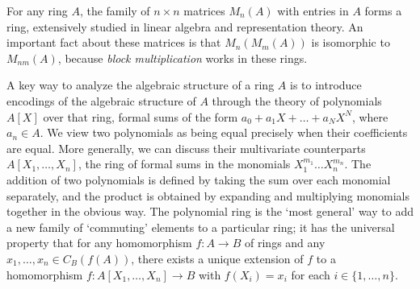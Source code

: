 \begin{example}
    For any ring $A$, the family of $n \times n$ matrices $M_n(A)$ with entries in $A$ forms a ring, extensively studied in linear algebra and representation theory. An important fact about these matrices is that $M_n(M_m(A))$ is isomorphic to $M_{nm}(A)$, because \emph{block multiplication} works in these rings.
\end{example}

\begin{example}
    A key way to analyze the algebraic structure of a ring $A$ is to introduce encodings of the algebraic structure of $A$ through the theory of polynomials $A[X]$ over that ring, formal sums of the form $a_0 + a_1X + \dots + a_NX^N$, where $a_n \in A$. We view two polynomials as being equal precisely when their coefficients are equal. More generally, we can discuss their multivariate counterparts $A[X_1, \dots, X_n]$, the ring of formal sums in the monomials $X_1^{m_1} \dots X_n^{m_n}$. The addition of two polynomials is defined by taking the sum over each monomial separately, and the product is obtained by expanding and multiplying monomials together in the obvious way. The polynomial ring is the `most general' way to add a new family of `commuting' elements to a particular ring; it has the universal property that for any homomorphism $f: A \to B$ of rings and any $x_1, \dots, x_n \in C_B(f(A))$, there exists a unique extension of $f$ to a homomorphism $f: A[X_1, \dots, X_n] \to B$ with $f(X_i) = x_i$ for each $i \in \{ 1, \dots, n \}$.
\end{example}

